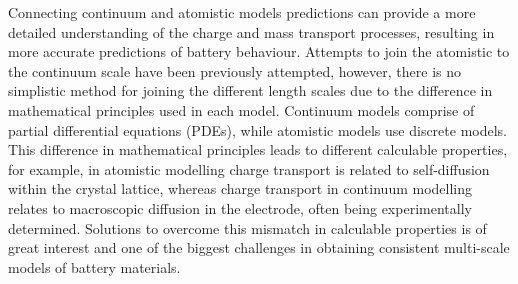 \documentclass[journal=jacsat,manuscript=article]{achemso}
\begin{document}
Connecting continuum and atomistic models predictions can provide a more detailed understanding of the charge and mass transport processes, resulting in more accurate predictions of battery behaviour. Attempts to join the atomistic to the continuum scale have been previously attempted, however, there is no simplistic method for joining the different length scales due to the difference in mathematical principles used in each model.\cite{Fackeldey2015} Continuum models comprise of partial differential equations (PDEs), while atomistic models use discrete models.\cite{Badia2007} This difference in mathematical principles leads to different calculable properties, for example, in atomistic modelling charge transport is related to self-diffusion within the crystal lattice, whereas charge transport in continuum modelling relates to macroscopic diffusion in the electrode, often being experimentally determined. Solutions to overcome this mismatch in calculable properties is of great interest and one of the biggest challenges in obtaining consistent multi-scale models of battery materials.


\end{document}

